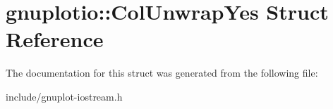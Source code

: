 \hypertarget{structgnuplotio_1_1ColUnwrapYes}{}\section{gnuplotio\+:\+:Col\+Unwrap\+Yes Struct Reference}
\label{structgnuplotio_1_1ColUnwrapYes}


The documentation for this struct was generated from the following file\+:\begin{DoxyCompactItemize}
\item 
include/gnuplot-\/iostream.\+h\end{DoxyCompactItemize}

